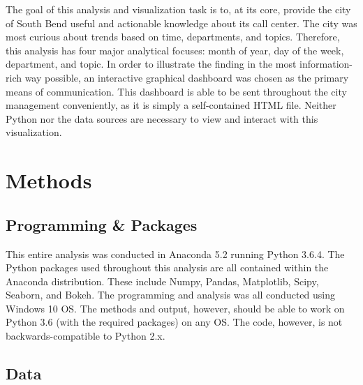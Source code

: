 \documentclass[11pt,twocolumn]{article}
\begin{document}
The goal of this analysis and visualization task is to, at its core, provide the city of South Bend useful and actionable knowledge about its call center.  The city was most curious about trends based on time, 
departments, and topics.  Therefore, this analysis has four major analytical focuses:  month of year, day of the week, department, and topic.  
In order to illustrate the finding in the most information-rich way possible, an interactive graphical dashboard was chosen as the primary means of communication.  This dashboard is able to be sent throughout the city management conveniently, as it is simply a self-contained HTML file.  Neither Python nor the data sources are necessary to view and interact with this visualization.


\section{Methods}

	\subsection{Programming \& Packages}

This entire analysis was conducted in Anaconda 5.2 running Python 3.6.4.  The Python packages used throughout this analysis are all contained within the Anaconda distribution.  These include Numpy, Pandas, Matplotlib, Scipy, Seaborn, and Bokeh.\cite{python}\cite{anaconda}  The programming and analysis was all conducted using Windows 10 OS.  The methods and output, however, should be able to work on Python 3.6 (with the required packages) on any OS.  The code, however, is not backwards-compatible to Python 2.x. 

	\subsection{Data}
\end{document}

